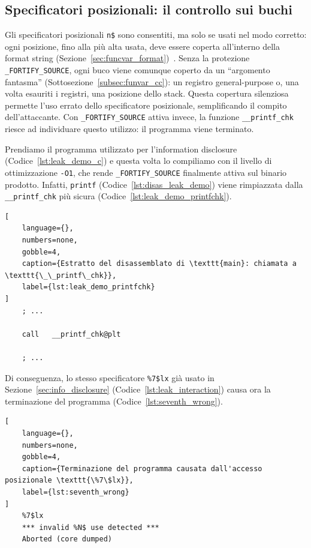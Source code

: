 \subsection{Specificatori posizionali: il controllo sui buchi}\label{subsec:pos_control}
Gli specificatori posizionali \texttt{n\$} sono consentiti, ma solo se usati nel modo corretto: ogni posizione, fino alla più alta usata, deve essere coperta all'interno della format string (Sezione~\ref{sec:funcvar_format})~\cite{captainplanet2010}.
Senza la protezione \texttt{\_FORTIFY\_SOURCE}, ogni buco viene comunque coperto da un ``argomento fantasma'' (Sottosezione~\ref{subsec:funvar_cc}): un registro general-purpose o, una volta esauriti i registri, una posizione dello stack. Questa copertura silenziosa permette l'uso errato dello specificatore posizionale, semplificando il compito dell'attaccante.
Con \texttt{\_FORTIFY\_SOURCE} attiva invece, la funzione \texttt{\_\_printf\_chk} riesce ad individuare questo utilizzo: il programma viene terminato.

Prendiamo il programma utilizzato per l'information disclosure (Codice~\ref{lst:leak_demo_c}) e questa volta lo compiliamo con il livello di ottimizzazione \texttt{-O1}, che rende \texttt{\_FORTIFY\_SOURCE} finalmente attiva sul binario prodotto. Infatti, \texttt{printf} (Codice~\ref{lst:disas_leak_demo}) viene rimpiazzata dalla \texttt{\_\_printf\_chk} più sicura (Codice~\ref{lst:leak_demo_printfchk}).
\begin{lstlisting}[
    language={},
    numbers=none,
    gobble=4,
    caption={Estratto del disassemblato di \texttt{main}: chiamata a \texttt{\_\_printf\_chk}},
    label={lst:leak_demo_printfchk}
]
    ; ...

    call   __printf_chk@plt

    ; ...
\end{lstlisting}

Di conseguenza, lo stesso specificatore \texttt{\%7\$lx} già usato in Sezione~\ref{sec:info_disclosure} (Codice~\ref{lst:leak_interaction}) causa ora la terminazione del programma (Codice~\ref{lst:seventh_wrong}).
\begin{lstlisting}[
    language={},
    numbers=none,
    gobble=4,
    caption={Terminazione del programma causata dall'accesso posizionale \texttt{\%7\$lx}},
    label={lst:seventh_wrong}
]
    %7$lx
    *** invalid %N$ use detected ***
    Aborted (core dumped)
\end{lstlisting}

